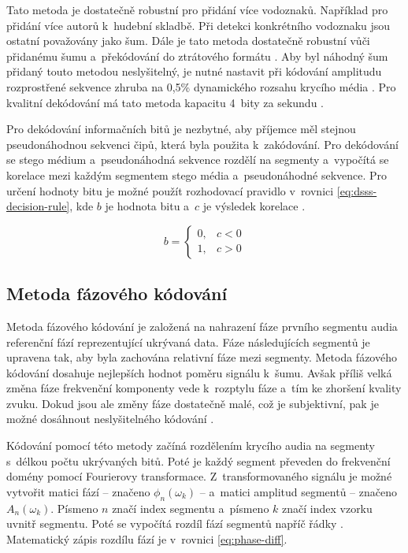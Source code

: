 Tato metoda je dostatečně robustní pro přidání více vodoznaků. Například pro
přidání více autorů k~hudební skladbě. Při detekci konkrétního vodoznaku jsou
ostatní považovány jako šum. Dále je tato metoda dostatečně robustní vůči
přidanému šumu a~překódování do ztrátového formátu \cite{Boney1996}. Aby byl
náhodný šum přidaný touto metodou neslyšitelný, je nutné nastavit při kódování
amplitudu rozprostřené sekvence zhruba na 0,5\% dynamického rozsahu krycího
média \cite{Bender1996}. Pro kvalitní dekódování má tato metoda kapacitu 4~bity
za sekundu \cite{Bender1996}.

Pro dekódování informačních bitů je nezbytné, aby příjemce měl stejnou
pseudonáhodnou sekvenci čipů, která byla použita k~zakódování. Pro dekódování
se stego médium a~pseudonáhodná sekvence rozdělí na segmenty a~vypočítá se
korelace mezi každým segmentem stego média a~pseudonáhodné sekvence. Pro určení
hodnoty bitu je možné použít rozhodovací pravidlo v~rovnici
\ref{eq:dsss-decision-rule}, kde $b$ je hodnota bitu a~$c$ je výsledek korelace
\cite{Kuznetsov2022}.

\begin{equation}
    \label{eq:dsss-decision-rule}
    b = \left\{
        \begin{array}{rl}
            0, & c < 0 \\
            1, & c > 0
        \end{array}
    \right.
\end{equation}

\subsection*{Metoda fázového kódování}
\label{sub:phase-coding}

Metoda fázového kódování je založená na nahrazení fáze prvního segmentu audia
referenční fází reprezentující ukrývaná data. Fáze následujících segmentů je
upravena tak, aby byla zachována relativní fáze mezi segmenty. Metoda fázového
kódování dosahuje nejlepších hodnot poměru signálu k~šumu. Avšak příliš velká
změna fáze frekvenční komponenty vede k~rozptylu fáze a~tím ke zhoršení kvality
zvuku. Dokud jsou ale změny fáze dostatečně malé, což je subjektivní, pak je
možné dosáhnout neslyšitelného kódování \cite{Bender1996}.

Kódování pomocí této metody začíná rozdělením krycího audia na segmenty
s~délkou počtu ukrývaných bitů. Poté je každý segment převeden do frekvenční
domény pomocí Fourierovy transformace. Z~transformovaného signálu je možné
vytvořit matici fází -- značeno $\phi_n(\omega_k)$ -- a~matici amplitud
segmentů -- značeno $A_n(\omega_k)$. Písmeno $n$ značí index segmentu a~písmeno
$k$ značí index vzorku uvnitř segmentu. Poté se vypočítá rozdíl fází segmentů
napříč řádky \cite{Bender1996}. Matematický zápis rozdílu fází je v~rovnici
\ref{eq:phase-diff}.

